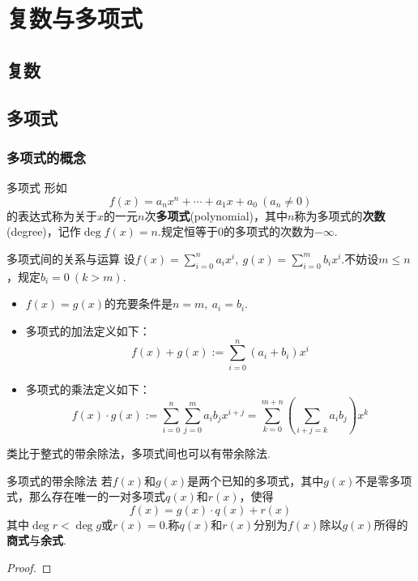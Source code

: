 \documentclass[lang=cn, zihao=5]{elegantbook}
\newcommand{\ssb}[1]{\left( #1 \right)}
\begin{document}
\part{复数与多项式}

\chapter{复数}

\chapter{多项式}

\section{多项式的概念}

\begin{definition}{多项式}
	形如$$f(x) = a_nx^n + \cdots + a_1x + a_0~(a_n \neq 0)$$的表达式称为关于$x$的一元$n$次\textbf{多项式}(polynomial)，其中$n$称为多项式的\textbf{次数}(degree)，记作$\deg f(x) = n$.规定恒等于$0$的多项式的次数为$-\infty$.
\end{definition}

\begin{definition}{多项式间的关系与运算}
	设$f(x) = \sum_{i=0}^{n}a_i x^i,~g(x) = \sum_{i=0}^{m}b_i x^i$.不妨设$m \leq n$，规定$b_i=0~(k > m)$.
	\begin{itemize}
		\item $f(x)=g(x)$的充要条件是$n=m,~a_i=b_i$.
		\item 多项式的加法定义如下：$$f(x) + g(x) := \sum_{i=0}^{n} (a_i + b_i)x^{i}$$
		\item 多项式的乘法定义如下：$$f(x) \cdot g(x) := \sum_{i=0}^{n} \sum_{j=0}^{m} a_ib_j x^{i+j} = \sum_{k=0}^{m+n} \ssb{\sum_{i+j=k}a_ib_j}x^k$$
	\end{itemize}
\end{definition}

类比于整式的带余除法，多项式间也可以有带余除法.

\begin{theorem}{多项式的带余除法}
	若$f(x)$和$g(x)$是两个已知的多项式，其中$g(x)$不是零多项式，那么存在唯一的一对多项式$q(x)$和$r(x)$，使得$$f(x) = g(x) \cdot q(x) + r(x)$$其中$\deg r < \deg g$或$r(x)=0$.称$q(x)$和$r(x)$分别为$f(x)$除以$g(x)$所得的\textbf{商式}与\textbf{余式}.
\end{theorem}
\begin{proof}
	
\end{proof}
\end{document}
